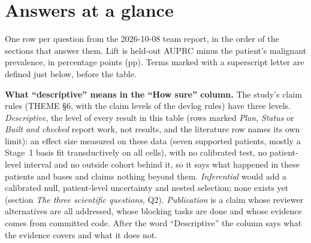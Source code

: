 \makeatletter
\providecommand{\glanceref}[1]{\@ifundefined{r@#1}{--}{\ref{#1}}}
\makeatother
\providecommand{\subq}{\leftskip=1em\relax}

\section*{Answers at a glance}
{}
\label{sec:glance}

One row per question from the 2026-10-08 team report, in the order of the sections that answer them. Lift is held-out AUPRC minus the patient's malignant prevalence, in percentage points (pp). Terms marked with a superscript letter are defined just below, before the table.

\textbf{What ``descriptive'' means in the ``How sure'' column.} The study's claim rules (THEME \S6, with the claim levels of the devlog rules) have three levels. \emph{Descriptive}, the level of every result in this table (rows marked \emph{Plan}, \emph{Status} or \emph{Built and checked} report work, not results, and the literature row names its own limit): an effect size measured on these data (seven supported patients, mostly a Stage~1 basis fit transductively on all cells), with no calibrated test, no patient-level interval and no outside cohort behind it, so it says what happened in these patients and bases and claims nothing beyond them. \emph{Inferential} would add a calibrated null, patient-level uncertainty and nested selection; none exists yet (section \emph{The three scientific questions}, Q2). \emph{Publication} is a claim whose reviewer alternatives are all addressed, whose blocking tasks are done and whose evidence comes from committed code. After the word ``Descriptive'' the column says what the evidence covers and what it does not.

